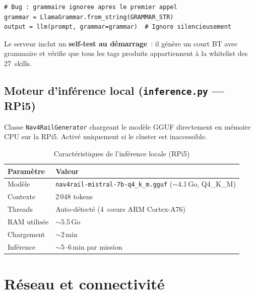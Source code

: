 \documentclass[a4paper,11pt]{article}
\newcommand{\file}[1]{\texttt{#1}}
\begin{document}
\begin{lstlisting}[style=python, caption={Bug silencieux --- ne pas faire}]
# Bug : grammaire ignoree apres le premier appel
grammar = LlamaGrammar.from_string(GRAMMAR_STR)
output = llm(prompt, grammar=grammar)  # Ignore silencieusement
\end{lstlisting}

Le serveur inclut un \textbf{self-test au démarrage}~: il génère un court
BT avec grammaire et vérifie que tous les tags produits appartiennent à la
whitelist des 27~skills.

\subsection{Moteur d'inférence local (\file{inference.py} --- RPi5)}
\label{sec:local}

Classe \texttt{Nav4RailGenerator} chargeant le modèle GGUF directement en
mémoire CPU sur la RPi5. Activé uniquement si le cluster est inaccessible.

\begin{table}[H]
\centering
\caption{Caractéristiques de l'inférence locale (RPi5)}
\label{tab:local-specs}
\begin{tabularx}{\textwidth}{@{}l X@{}}
\toprule
\textbf{Paramètre} & \textbf{Valeur} \\
\midrule
Modèle         & \file{nav4rail-mistral-7b-q4\_k\_m.gguf} ($\sim$4.1\,Go, Q4\_K\_M) \\
Contexte       & 2\,048 tokens \\
Threads        & Auto-détecté (4~cœurs ARM Cortex-A76) \\
RAM utilisée   & $\sim$5.5\,Go \\
Chargement     & $\sim$2\,min \\
Inférence      & $\sim$5--6\,min par mission \\
\bottomrule
\end{tabularx}
\end{table}

\section{Réseau et connectivité}
\label{sec:network}
\end{document}
